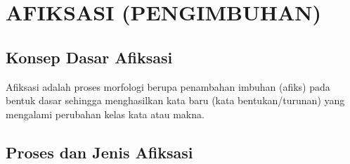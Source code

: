 \documentclass[12pt, a4paper]{article}
\begin{document}
\section{AFIKSASI (PENGIMBUHAN)}

\subsection{Konsep Dasar Afiksasi}
Afiksasi adalah proses morfologi berupa penambahan imbuhan (afiks) pada bentuk dasar sehingga menghasilkan kata baru (kata bentukan/turunan) yang mengalami perubahan kelas kata atau makna.

\subsection{Proses dan Jenis Afiksasi}
\end{document}
